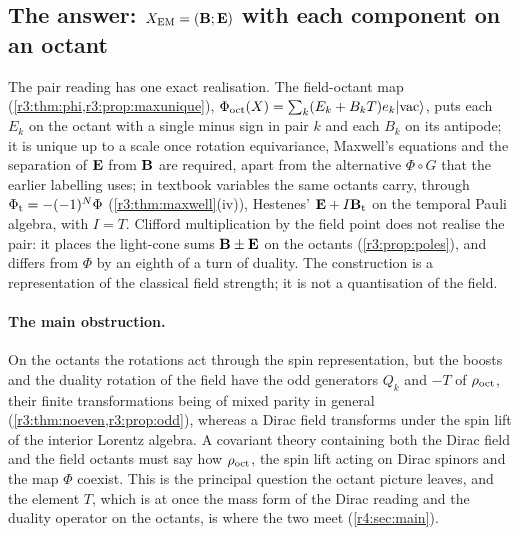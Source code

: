 \subsection{\texorpdfstring{The answer: $X_{\rm EM}=(\mathbf B;\mathbf E)$ with each component on an octant}{The answer: X\_EM = (B;E) with each component on an octant}}
\label{r3:sec:answer}

The pair reading has one exact realisation. The field-octant map (\cref{r3:thm:phi,r3:prop:maxunique}),
$\Phi_{\rm oct}(X)=\sum_k(E_k+B_kT)e_k|\mathrm{vac}\rangle$, puts each $E_k$ on the octant with a single minus sign in pair $k$ and each $B_k$ on its antipode; it
is unique up to a scale once rotation equivariance, Maxwell's equations and the separation of $\mathbf E$ from $\mathbf B$ are required, apart from the
alternative $\Phi\circ G$ that the earlier labelling uses; in textbook variables the same octants carry, through $\Phi_{\rm t}=-(-1)^N\Phi$
(\cref{r3:thm:maxwell}(iv)), Hestenes' $\mathbf E+I\mathbf B_{\rm t}$ on the temporal Pauli algebra, with $I=T$. Clifford multiplication by the field point does
not realise the pair: it places the light-cone sums $\mathbf B\pm\mathbf E$ on the octants (\cref{r3:prop:poles}), and differs from $\Phi$ by an eighth of a turn
of duality. The construction is a representation of the classical field strength; it is not a quantisation of the field.

\paragraph{The main obstruction.} On the octants the rotations act through the spin representation, but the boosts and the duality rotation
of the field have the odd generators $Q_k$ and $-T$ of $\rho_{\rm oct}$, their finite transformations being of mixed parity in general
(\cref{r3:thm:noeven,r3:prop:odd}), whereas a Dirac field transforms
under the spin lift of the interior Lorentz algebra. A covariant theory containing both the Dirac field and the field octants must say how
$\rho_{\rm oct}$, the spin lift acting on Dirac spinors and the map $\Phi$ coexist. This is the principal question the octant picture leaves, and the
element $T$, which is at once the mass form of the Dirac reading and the duality operator on the octants, is where the two meet
(\cref{r4:sec:main}).

